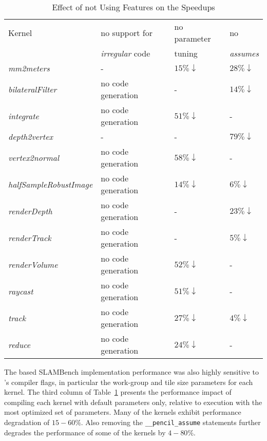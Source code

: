 \documentclass{llncs}
\begin{document}
\begin{table}[htbp]
\centering
\begin{center}
\scalebox{0.75} {
\begin{tabular}{|l|l|l|l|}
\hline                       
Kernel & no support for            & no parameter & no  \\
       & \textit{irregular} code   & tuning &  \textit{assumes} \\
\hline
\textit{mm2meters}             &     	-	           & $15\% \downarrow$   &  $28\% \downarrow$ \\
\textit{bilateralFilter}       & 	no code	generation &     -               &  $14\% \downarrow$ \\	
\textit{integrate}             & 	no code	generation &	 $51\% \downarrow$   &   -                \\                       
\textit{depth2vertex}          &     	-	           &     -                &  $79\% \downarrow$ \\
\textit{vertex2normal}         & 	no code generation & $58\% \downarrow$    &   -             \\
\textit{halfSampleRobustImage} & 	no code	generation & $14\% \downarrow$   &  $6\% \downarrow$ \\
\textit{renderDepth}           & 	no code	generation &     -               &  $23\% \downarrow$ \\
\textit{renderTrack}           & 	no code	generation &     -               &  $5\% \downarrow$ \\
\textit{renderVolume}          & 	no code	generation & $52\% \downarrow$   &   -	 \\
\textit{raycast}               & 	no code	generation & $51\% \downarrow$   &   -             \\
\textit{track}                 & 	no code	generation & $27\% \downarrow$   &  $4\% \downarrow$ \\
\textit{reduce}                & 	no code	generation & $24\% \downarrow$   & 	-	 \\
\hline
\end{tabular} }
\end{center}
\vskip-0.2cm
\caption{\label{SLAMBench_Features}Effect of not Using \pencil Features on the Speedups}
\vskip-0.5cm
\end{table}  

The \pencil based SLAMBench implementation performance was also
highly sensitive to \PPCG's compiler flags, in particular the
work-group and tile size parameters for each kernel.
The third column of Table~\ref{SLAMBench_Features} presents the
performance impact of compiling each kernel with default
parameters only, relative to execution with the most optimized
set of parameters.
Many of the kernels exhibit performance degradation of $15-60\%$.
Also removing the \lstinline!__pencil_assume! statements further
degrades the performance of some of the kernels by $4-80\%$.
\end{document}
